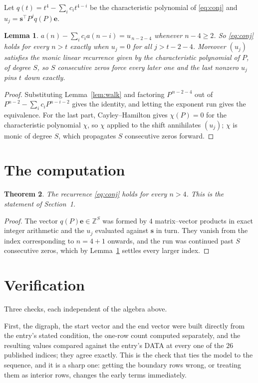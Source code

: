 \documentclass[11pt,a4paper]{article}
\theoremstyle{plain}
\newtheorem{theorem}{Theorem}
\newtheorem{lemma}[theorem]{Lemma}
\theoremstyle{definition}
\begin{document}
Let $q(t)=t^{4}-\sum_i c_i t^{4-i}$ be the characteristic polynomial of
\eqref{eq:conj} and $u_j=\mathbf{s}^{\!\top}P^{j}q(P)\mathbf{e}$.

\begin{lemma}\label{lem:crit}
$a(n)-\sum_i c_i a(n-i)=u_{\,n-2-4}$ whenever $n-4\ge2$. So \eqref{eq:conj}
holds for every $n>t$ exactly when $u_j=0$ for all $j>t-2-4$. Moreover $(u_j)$
satisfies the monic linear recurrence given by the characteristic polynomial of $P$, of
degree $S$, so $S$ consecutive zeros force every later one and the last nonzero $u_j$ pins
$t$ down exactly.
\end{lemma}

\begin{proof}
Substituting Lemma~\ref{lem:walk} and factoring $P^{\,n-2-4}$ out of
$P^{n-2}-\sum_i c_i P^{n-i-2}$ gives the identity, and letting the exponent run gives the
equivalence. For the last part, Cayley--Hamilton gives $\chi(P)=0$ for the characteristic
polynomial $\chi$, so $\chi$ applied to the shift annihilates $(u_j)$; $\chi$ is monic of
degree $S$, which propagates $S$ consecutive zeros forward.
\end{proof}

\section{The computation}

\begin{theorem}
The recurrence \eqref{eq:conj} holds for every $n>4$. This is the statement of
Section~1.
\end{theorem}

\begin{proof}
The vector $q(P)\mathbf{e}\in\mathbb{Z}^{S}$ was formed by $4$ matrix--vector
products in exact integer arithmetic and the $u_j$ evaluated against $\mathbf{s}$ in turn.
They vanish from the index corresponding to $n=4+1$ onwards, and the run was continued
past $S$ consecutive zeros, which by Lemma~\ref{lem:crit} settles every larger index.
\end{proof}

\section{Verification}

Three checks, each independent of the algebra above.

First, the digraph, the start vector and the end vector were built directly from the
entry's stated condition, the one-row count computed separately, and the resulting values
compared against the entry's DATA at every one of the $26$ published indices; they
agree exactly. This is the check that ties the model to the sequence, and it is a sharp one:
getting the boundary rows wrong, or treating them as interior rows, changes the early terms
immediately.
\end{document}
